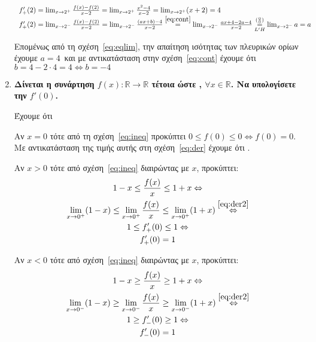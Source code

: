 \begin{enumerate}
		\[
			\begin{tabular}{l}
			$f_{+}'(2) = \lim_{x\to 2^{+}} \frac{f(x) - f(2)}{x - 2} =
			\lim_{x\to 2^{+}} \frac{x^{2} - 4}{x - 2} = \lim_{x\to 2^{+}} (x+2)
			= 4$ \\
			$f_{+}'(2) = \lim_{x\to 2^{-}} \frac{f(x)- f(2)}{x-2} = \lim_{x\to
			2^{-}} \frac{(ax+b) - 4}{x - 2}\overset{\eqref{eq:cont}}{=} \lim_{x\to 2^{-}}
				\frac{ax+4 - 2a - 4}{x - 2}
				\overset{(\frac{0}{0})}{\underset{L'H}{=}} \lim_{x\to 2^{-}} a = a$
			\end{tabular}
		\]
		
		Επομένως από τη σχέση~\eqref{eq:eqlim}, την απαίτηση ισότητας των
		πλευρικών ορίων έχουμε $ a = 4 $ και με αντικατάσταση στην
		σχέση~\eqref{eq:cont} έχουμε ότι $ b = 4 - 2\cdot 4 = 4 \Leftrightarrow
		b = -4$ 




	\item {\bfseries \boldmath Δίνεται η συνάρτηση $ f(x) \colon \mathbb{R} \to \mathbb{R} $ τέτοια
		ώστε , 
	$ \forall x \in \mathbb{R} $. Να υπολογίσετε την $ f'(0) $.}


		
		Έχουμε ότι  

		Αν $ x=0 $ τότε από τη σχέση~\eqref{eq:ineq} προκύπτει $ 0 \leq f(0) \leq 0
		\Leftrightarrow f(0) = 0$. Με αντικατάσταση της τιμής αυτής στη
		σχέση~\eqref{eq:der} έχουμε ότι .
		
		\begin{minipage}{0.45\textwidth}
		Αν $ x>0 $ τότε από σχέση~\eqref{eq:ineq} διαιρώντας με $x$, προκύπτει:
		\begin{gather*}
			1-x \leq \frac{f(x)}{x} \leq 1+x \Leftrightarrow \\ 
			\lim_{x\to 0^{+}}(1-x) \leq \lim_{x\to 0^{+}} \frac{f(x)}{x}
			\leq \lim_{x\to 0^{+}} (1+x)\overset{\eqref{eq:der2}}\Leftrightarrow
			\\
			1 \leq f_{+}'(0) \leq 1 \Leftrightarrow \\
			f_{+}'(0) = 1
		\end{gather*}
		\end{minipage} \hfill 
		\begin{minipage}{0.45\textwidth}
		Αν $ x<0 $ τότε από σχέση~\eqref{eq:ineq} διαιρώντας με $x$, προκύπτει:
			\begin{gather*}
			1-x \geq \frac{f(x)}{x} \geq 1+x \Leftrightarrow \\ 
			\lim_{x\to 0^{-}}(1-x) \geq \lim_{x\to 0^{-}} \frac{f(x)}{x}
			\geq \lim_{x\to 0^{-}} (1+x)\overset{\eqref{eq:der2}}\Leftrightarrow
			\\
			1 \geq f_{-}'(0) \geq 1 \Leftrightarrow \\
			f_{-}'(0) = 1
			\end{gather*}
		\end{minipage} 


\end{enumerate}
